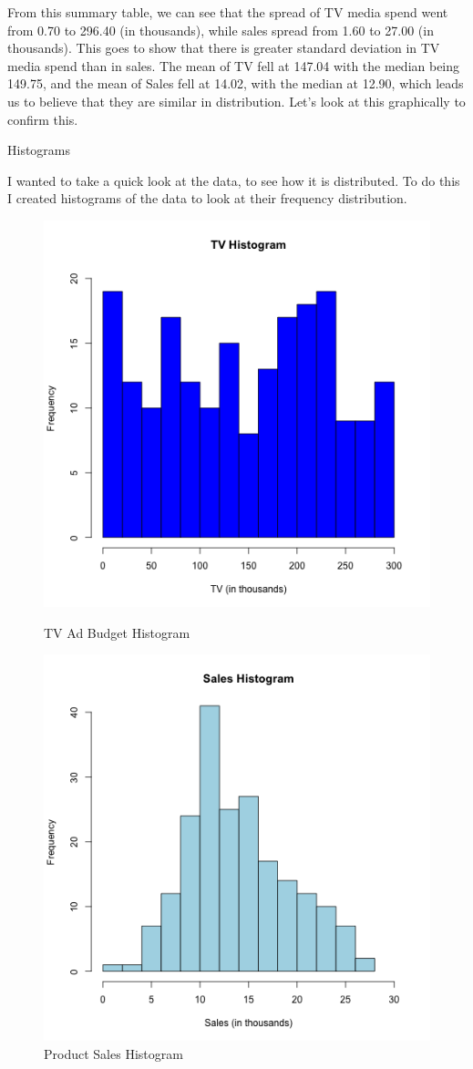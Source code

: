 \documentclass[12pt]{article}
\begin{document}
From this summary table, we can see that the spread of TV media spend went from 0.70 to 296.40 (in thousands), while sales spread from 1.60 to 27.00 (in thousands). This goes to show that there is greater standard deviation in TV media spend than in sales. The mean of TV fell at 147.04 with the median being 149.75, and the mean of Sales fell at 14.02, with the median at 12.90, which leads us to believe that they are similar in distribution. Let's look at this graphically to confirm this.

Histograms

I wanted to take a quick look at the data, to see how it is distributed. To do this I created histograms of the data to look at their frequency distribution.

\begin{figure}[h]
\centering
\begin{minipage}{.5\textwidth}
  \centering
  \includegraphics[width=.75\textwidth]{histogram-tv.png}
  \caption{TV Ad Budget Histogram}
\end{minipage}%
\begin{minipage}{.5\textwidth}
  \centering
  \includegraphics[width=.75\textwidth]{histogram-sales.png}
  \caption{Product Sales Histogram}
\end{minipage}
\end{figure}
\end{document}
